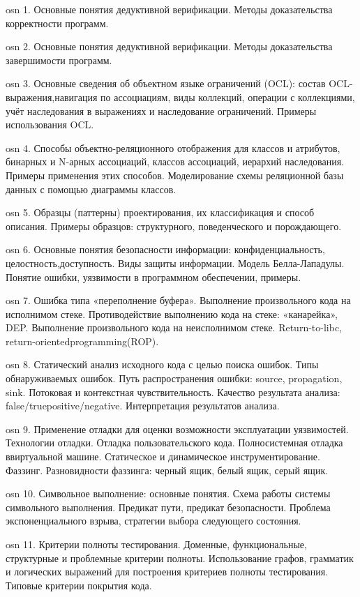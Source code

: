 osn 1. Основные понятия дедуктивной верификации. Методы доказательства корректности программ.

osn 2.  Основные понятия дедуктивной верификации. Методы доказательства завершимости программ.

osn 3. Основные сведения об объектном языке ограничений (OCL): состав OCL-выражения,навигация по ассоциациям, виды коллекций, операции с коллекциями, учёт наследования в выражениях и наследование ограничений. Примеры использования OCL.

osn 4. Способы объектно-реляционного отображения для классов и атрибутов, бинарных и N-арных ассоциаций, классов ассоциаций, иерархий наследования. Примеры применения этих способов. Моделирование схемы реляционной базы данных с помощью диаграммы классов.

osn 5. Образцы (паттерны) проектирования, их классификация и способ описания. Примеры образцов: структурного, поведенческого и порождающего.

osn 6. Основные понятия безопасности информации: конфиденциальность, целостность,доступность. Виды защиты информации. Модель Белла-Лападулы. Понятие ошибки, уязвимости в программном обеспечении, примеры.

osn 7. Ошибка типа «переполнение буфера». Выполнение произвольного кода на исполнимом стеке. Противодействие выполнению кода на стеке: «канарейка», DEP. Выполнение произвольного кода на неисполнимом стеке. Return-to-libc, return-orientedprogramming(ROP).

osn 8. Статический анализ исходного кода с целью поиска ошибок. Типы обнаруживаемых ошибок. Путь распространения ошибки: source, propagation, sink. Потоковая и контекстная чувствительность. Качество результата анализа: false/truepositive/negative. Интерпретация результатов анализа.

osn 9. Применение отладки для оценки возможности эксплуатации уязвимостей. Технологии отладки. Отладка пользовательского кода. Полносистемная отладка ввиртуальной машине. Статическое и динамическое инструментирование. Фаззинг. Разновидности фаззинга: черный ящик, белый ящик, серый ящик.

osn 10. Символьное выполнение: основные понятия. Схема работы системы символьного выполнения. Предикат пути, предикат безопасности. Проблема экспоненциального взрыва, стратегии выбора следующего состояния.

osn 11. Критерии полноты тестирования. Доменные, функциональные, структурные и проблемные критерии полноты. Использование графов, грамматик и логических выражений для построения критериев полноты тестирования. Типовые критерии покрытия кода.

